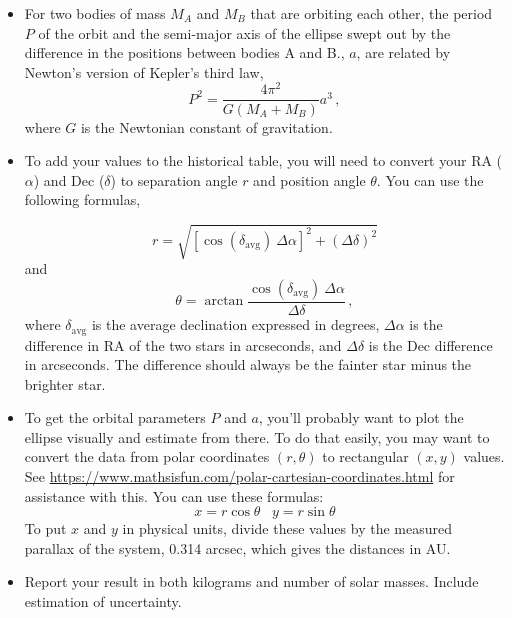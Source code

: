 \begin{itemize}
	\item For two bodies of mass $M_A$ and $M_B$ that are orbiting each other, the period $P$ of the orbit and the semi-major axis of the ellipse swept out by the difference in the positions between bodies A and B., $a$, are related by Newton's version of Kepler's third law,
	\begin{equation}
	P^2 = \frac{4\pi^2}{G(M_A + M_B)}a^3 \,,
	\end{equation}
	where $G$ is the Newtonian constant of gravitation.

	\item To add your values to the historical table, you will need to convert your RA ($\alpha$) and Dec ($\delta$) to separation angle $r$ and position angle $\theta$. You can use the following formulas,
	
	\begin{equation}
	r = \sqrt{[\cos(\delta_{\textrm{avg}}) \: \Delta\alpha]^2 + (\Delta\delta)^2}
	\end{equation}
	and
	\begin{equation}
	\theta = \arctan{\frac{\cos(\delta_{\textrm{avg}})\:\Delta\alpha}{\Delta\delta}}\,,
	\end{equation}
	where $\delta_{\textrm{avg}}$ is the average declination expressed in degrees, $\Delta\alpha$ is the difference in RA of the two stars in arcseconds, and $\Delta\delta$ is the Dec difference in arcseconds. The difference should always be the fainter star minus the brighter star.
	
	\item To get the orbital parameters $P$ and $a$, you'll probably want to plot the ellipse visually and estimate from there. To do that easily, you may want to convert the data from polar coordinates $(r,\theta)$ to rectangular $(x,y)$ values. See \url{https://www.mathsisfun.com/polar-cartesian-coordinates.html} for assistance with this. You can use these formulas:
	\begin{equation}
	x = r\cos\theta\;\;\;y = r\sin\theta
	\end{equation}
	To put $x$ and $y$ in physical units, divide these values by the measured parallax of the system, 0.314 arcsec, which gives the distances in AU.
	
	\item Report your result in both kilograms and number of solar masses. Include estimation of uncertainty.
\end{itemize}

